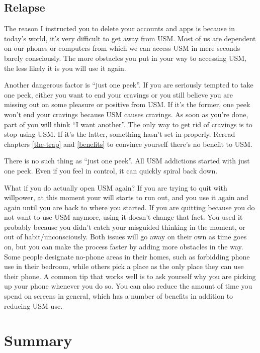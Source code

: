\documentclass[
  openany]{book}
\newenvironment{rmdcaution}{
\color{red}
\begin{framed}}{\end{framed}}
\begin{document}
\section{Relapse}\label{relapse}

The reason I instructed you to delete your accounts and apps is because in today's world, it's very difficult to get away from USM. Most of us are dependent on our phones or computers from which we can access USM in mere seconds barely consciously. The more obstacles you put in your way to accessing USM, the less likely it is you will use it again.

Another dangerous factor is ``just one peek''. If you are seriously tempted to take one peek, either you want to end your cravings or you still believe you are missing out on some pleasure or positive from USM. If it's the former, one peek won't end your cravings because USM causes cravings. As soon as you're done, part of you will think ``I want another''. The only way to get rid of cravings is to stop using USM. If it's the latter, something hasn't set in properly. Reread chapters \ref{the-trap} and \ref{benefits} to convince yourself there's no benefit to USM.

\begin{rmdcaution}
There is no such thing as ``just one peek''. All USM addictions started with just one peek. Even if you feel in control, it can quickly spiral back down.

\end{rmdcaution}

What if you do actually open USM again? If you are trying to quit with willpower, at this moment your will starts to run out, and you use it again and again until you are back to where you started. If you are quitting because you do not want to use USM anymore, using it doesn't change that fact. You used it probably because you didn't catch your misguided thinking in the moment, or out of habit/unconsciously. Both issues will go away on their own as time goes on, but you can make the process faster by adding more obstacles in the way. Some people designate no-phone areas in their homes, such as forbidding phone use in their bedroom, while others pick a place as the only place they can use their phone. A common tip that works well is to ask yourself why you are picking up your phone whenever you do so. You can also reduce the amount of time you spend on screens in general, which has a number of benefits in addition to reducing USM use.

\chapter{Summary}\label{summary}
\end{document}
